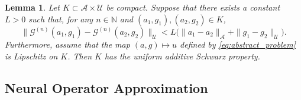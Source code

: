 \documentclass[preprint,11pt]{elsarticle}
\newtheorem{lemma}{Lemma}
\theoremstyle{plain}
\newcommand{\N}{\mathbb{N}}
\newcommand{\G}{\mathcal{G}}
\newcommand{\A}{\mathcal{A}}
\newcommand{\U}{\mathcal{U}}
\begin{document}
\begin{lemma}
    \label{lemma:uniform_locally_lip}
    Let $K \subset \A \times \U$ be compact. Suppose that there exists a constant $L > 0$ such that, for any $n \in \N$ and $(a_1,g_1), (a_2,g_2) \in K$,
    \begin{equation}
        \|\G^{(n)}(a_1,g_1) - \G^{(n)}(a_2,g_2)\|_{\U} < L \big ( \|a_1 - a_2\|_\A + \|g_1 - g_2\|_\U \big ).
    \end{equation}
    Furthermore, assume that the map $(a,g) \mapsto u$ defined by \eqref{eq:abstract_problem} is Lipschitz on $K$. Then $K$ has the uniform additive Schwarz property.
\end{lemma}


\subsection{Neural Operator Approximation}
\label{sec:neural_op_approx}
\end{document}
